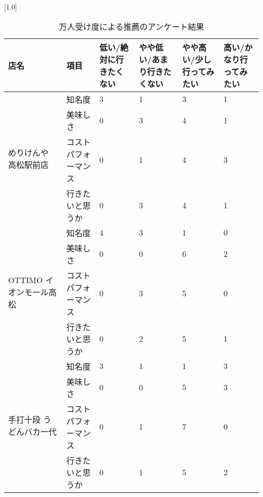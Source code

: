\begin{table}[H]
\centering
\caption{万人受け度による推薦のアンケート結果}
\label{table:questionnaire:addictivity}
\small
\scalebox{0.7}[1.0]{
\begin{tabular}{|l|l|l|l|l|l|}
\hline
店名 & 項目 & 低い/絶対に行きたくない & やや低い/あまり行きたくない & やや高い/少し行ってみたい & 高い/かなり行ってみたい \\ \hline
\multirow{4}{*}{めりけんや 高松駅前店} & 知名度 & 3 & 1 & 3 & 1 \\ \cline{2-6}
 & 美味しさ & 0 & 3 & 4 & 1 \\ \cline{2-6}
 & コストパフォーマンス & 0 & 1 & 4 & 3 \\ \cline{2-6}
 & 行きたいと思うか & 0 & 3 & 4 & 1 \\ \hline
\multirow{4}{*}{OTTIMO イオンモール高松} & 知名度 & 4 & 3 & 1 & 0 \\ \cline{2-6}
 & 美味しさ & 0 & 0 & 6 & 2 \\ \cline{2-6}
 & コストパフォーマンス & 0 & 3 & 5 & 0 \\ \cline{2-6}
 & 行きたいと思うか & 0 & 2 & 5 & 1 \\ \hline
\multirow{4}{*}{手打十段 うどんバカ一代} & 知名度 & 3 & 1 & 1 & 3 \\ \cline{2-6}
 & 美味しさ & 0 & 0 & 5 & 3 \\ \cline{2-6}
 & コストパフォーマンス & 0 & 1 & 7 & 0 \\ \cline{2-6}
 & 行きたいと思うか & 0 & 1 & 5 & 2 \\ \hline
\end{tabular}
}
\end{table}
